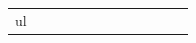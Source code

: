 \documentclass[conference]{IEEEtran}
\begin{document}
\begin{figure}
\begin{center}
\begin{tabular}{| x{1.11cm} | x{.75cm} | x{.75cm} || x{1.11cm} | x{.75cm} | x{.75cm} || x{1.11cm} | x{.75cm} | x{.75cm} || x{1.11cm} | x{.75cm} | x{.75cm} |}
ul
\end{tabular}
\end{center}
\end{figure}
\end{document}
